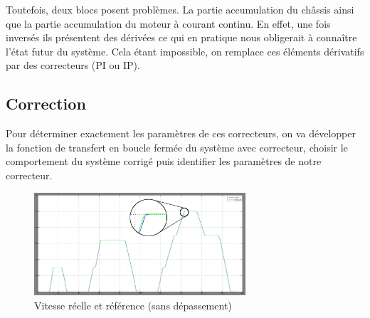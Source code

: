 Toutefois, deux blocs posent problèmes. La partie accumulation du châssis ainsi que la partie accumulation du moteur à courant continu. En effet, une fois inversés ils présentent des dérivées ce qui en pratique nous obligerait à connaître l'état futur du système. Cela étant impossible, on remplace ces éléments dérivatifs par des correcteurs (PI ou IP).\\

\subsection{Correction}
Pour déterminer exactement les paramètres de ces correcteurs, on va développer la fonction de transfert en boucle fermée du système avec correcteur, choisir le comportement du système corrigé puis identifier les paramètres de notre correcteur.\\



\begin{figure}[ht]
\begin{center}
	\includegraphics[width=0.7\textwidth]{images/vitesse_zoom}
	\caption{Vitesse réelle et référence (sans dépassement)}\label{img:vitesse}
\end{center}
\end{figure}